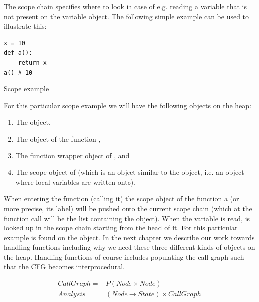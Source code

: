The scope chain specifies where to look in case of e.g. reading a variable that is not present on the variable object. The following simple example can be used to illustrate this:

\begin{listing}[H]
	\begin{verbatim}
x = 10
def a():
	return x
a() # 10
	\end{verbatim}
\caption{Scope example}\label{code:ScopeExample}
\end{listing}

For this particular scope example we will have the following objects on the heap:

\begin{enumerate}
  \item The  object,
  \item The object of the function ,
  \item The function wrapper object of , and
  \item The scope object of  (which is an object similar to the  object, i.e. an object where local variables are written onto).
\end{enumerate}

When entering the function (calling it) the scope object of the function a (or more precise, its label) will be pushed onto the current scope chain (which at the function call will be the list containing the  object). When the variable  is read,  is looked up in the scope chain starting from the head of it. For this particular example  is found on the  object. In the next chapter we describe our work towards handling functions including why we need these three different kinds of objects on the heap. Handling functions of course includes populating the call graph such that the CFG becomes interprocedural.

\begin{eqnarray*}
CallGraph = & P(Node \times Node) \\
Analysis = & (Node \rightarrow State) \times CallGraph
\end{eqnarray*}


